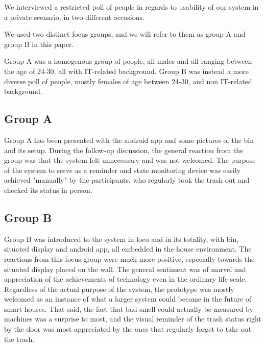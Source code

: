 
We interviewed a restricted poll of people in regards to usability of our system in a private scenario, 
in two different occasions.

We used two distinct focus groups, and we will refer to them as group A and group B in this paper.

Group A was a homogenous group of people, all males and all ranging between the age of 24-30, all with IT-related background.
Group B was instead a more diverse poll of people, mostly females of age between 24-30, and non IT-related background.

\subsection{Group A}

Group A has been presented with the android app and some pictures of the bin and its setup.
During the follow-up discussion, the general reaction from the group was that the system felt unnecessary and was not welcomed. 
The purpose of the system to serve as a reminder and state monitoring device was easily achieved "manually" by the participants, who regularly took the trash out and checked its status in person.

\subsection{Group B}

Group B was introduced to the system in loco and in its totality, with bin, situated display and android app, all embedded in the house environment. 
The reactions from this focus group were much more positive, especially towards the situated display placed on the wall.
The general sentiment was of marvel and appreciation of the achievements of technology even in the ordinary life scale.
Regardless of the actual purpose of the system, the prototype was mostly welcomed as an instance of what a larger system could become in the future of smart houses.
That said, the fact that bad smell could actually be measured by machines was a surprise to most, and the visual reminder of the trash status right by the door was most appreciated by the ones that regularly forget to take out the trash.
